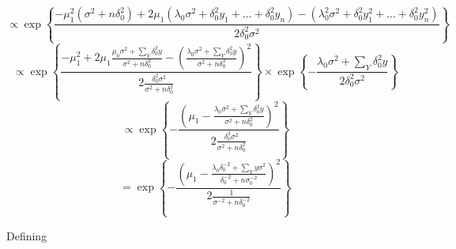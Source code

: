 \documentclass[12pt,a4paper,leqno]{report}
\theoremstyle{plain}
\theoremstyle{definition}
\theoremstyle{remark}
\begin{document}
\begin{def}\label{}
\begin{equation}\label{}
    \propto
    \exp{
        \left \{
            \frac{
                -\mu_1^2 (\sigma^2 + n\delta_0^2)
                + 2 \mu_1 (\lambda_0 \sigma^2 + \delta_0^2 y_1 + \ldots + \delta_0^2 y_n)
                - (\lambda_0^2 \sigma^2 + \delta_0^2 y_1^2 + \ldots + \delta_0^2 y_n^2)
            }
            {2\delta_0^2 \sigma^2}
        \right \}
    }
\end{equation}
\begin{equation}\label{}
\propto
\exp{
    \left \{
        \frac{
            - \mu_1^2
            + 2 \mu_1 \frac{\mu_0 \sigma^2 + \sum_{Y} \delta_0^2 y}
                {\sigma^2 + n \delta_0^2}
            - \left(
                \frac{
                    \lambda_0 \sigma^2 + \sum_{Y} \delta_0^2 y
                }
                {\sigma^2 + n \delta_0^2}
            \right)^2
        }
        {
        2 \frac{\delta_0^2 \sigma^2}{\sigma^2 + n\delta_0^2}
        }
    \right \}
}
\times
\exp{
    \left \{
        -\frac{
            \lambda_0 \sigma^2 + \sum_{Y} \delta_0^2 y
        }
        {
            2 \delta_0^2 \sigma^2
        }
    \right \}
}
\end{equation}
\begin{equation}
    \propto
    \exp{
        \left \{
            -
            \frac{
                \left(
                    \mu_1
                    -
                    \frac{
                        \lambda_0 \sigma^2 + \sum_{Y} \delta_0^2 y
                    }
                    {
                        \sigma^2 + n \delta_0^2
                    }
                \right)^2
            }
            {
                2 \frac{
                    \delta_0^2 \sigma^2
                }
                {\sigma^2 + n \delta_0^2}
            }
        \right \}
    }
\end{equation}
\begin{equation}
    =
    \exp{
        \left \{
            -
            \frac{
                \left(
                    \mu_1
                    -
                    \frac{
                        \lambda_0 \delta_0^{-2} + \sum_{Y} y \sigma^2
                    }
                    {
                        \delta_0^{-2} + n \sigma_0^{-2}
                    }
                \right)^2
            }
            {
                2 \frac{1}
                {
                    \sigma^{-2} + n \delta_0^{-2}
                }
            }
        \right \}
    }
\end{equation}
\end{def}Defining
\end{document}
